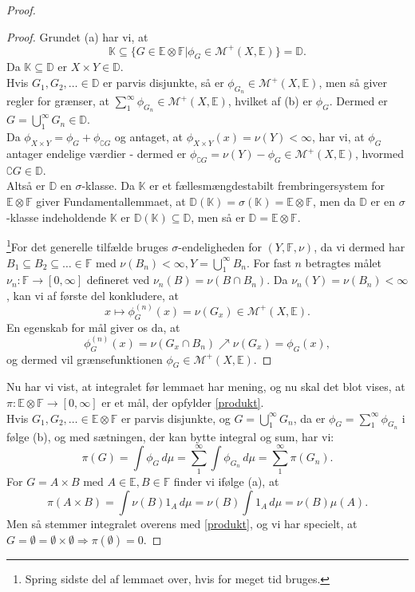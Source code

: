 \documentclass[12pt]{report}
\theoremstyle{break}
\newtheorem*{proof}{Bevis}
\theoremstyle{break}
\newcommand{\Int}[1]{\int#1\,d\mu}
\newcommand{\EE}{\mathbb{E}}
\newcommand{\FF}{\mathbb{F}}
\newcommand{\M}{\mathcal{M}^+}
\newcommand{\K}{\mathbb{K}}
\newcommand{\D}{\mathbb{D}}
\newcommand{\1}{\mathds{1}}
\begin{document}
\begin{proof}
\begin{proof}
\bigskip

Grundet (a) har vi, at 
\[\K\subseteq\{G\in\EE\otimes\FF\vert\phi_G\in\M(X,\EE)\}=\D.\]
Da $\K\subseteq\D$ er $X\times Y\in\D$.\\
Hvis $G_1,G_2,\ldots\in\D$ er parvis disjunkte, så er $\phi_{G_n}\in\M(X,\EE)$, men så giver regler for grænser, at $\sum_1^\infty\phi_{G_n}\in\M(X,\EE)$, hvilket af (b) er $\phi_G$. Dermed er $G=\bigcup_1^\infty G_n\in\D$.\\
Da $\phi_{X\times Y} = \phi_G + \phi_{\complement G}$ og antaget, at  $\phi_{X\times Y}(x)=\nu(Y)<\infty$, har vi, at $\phi_G$ antager endelige værdier - dermed er $\phi_{\complement G} = \nu(Y)-\phi_G\in\M(X,\EE)$, hvormed $\complement G\in\D$.\\
Altså er $\D$ en $\sigma$-klasse. Da $\K$ er et fællesmængdestabilt frembringersystem for $\EE\otimes\FF$ giver Fundamentallemmaet, at $\D(\K)=\sigma(\K)=\EE\otimes\FF$, men da $\D$ er en $\sigma$-klasse indeholdende $\K$ er $\D(\K)\subseteq\D$, men så er $\D=\EE\otimes\FF$.

\bigskip

\footnote{Spring sidste del af lemmaet over, hvis for meget tid bruges.}For det generelle tilfælde bruges $\sigma$-endeligheden for $(Y,\FF,\nu)$, da vi dermed har $B_1\subseteq B_2\subseteq\ldots\in\FF$ med $\nu(B_n)<\infty, Y=\bigcup_1^\infty B_n$. For fast $n$ betragtes målet $\nu_n\colon\FF\to[0,\infty]$ defineret ved $\nu_n(B)=\nu(B\cap B_n)$. Da $\nu_n(Y)=\nu(B_n)<\infty$, kan vi af første del konkludere, at
\[x\mapsto\phi^{(n)}_G(x)=\nu(G_x)\in\M(X,\EE).\]
En egenskab for mål giver os da, at 
\[\phi^{(n)}_G(x)=\nu(G_x\cap B_n)\nearrow\nu(G_x)=\phi_G(x),\]
og dermed vil grænsefunktionen $\phi_G\in\M(X,\EE).$
\end{proof}
Nu har vi vist, at integralet før lemmaet har mening, og nu skal det blot vises, at $\pi\colon\EE\otimes\FF\to[0,\infty]$ er et mål, der opfylder \eqref{produkt}.\\
Hvis $G_1,G_2,\ldots\in\EE\otimes\FF$ er parvis disjunkte, og $G=\bigcup_1^\infty G_n$, da er $\phi_G=\sum_1^\infty\phi_{G_n}$ i følge (b), og med sætningen, der kan bytte integral og sum, har vi:
\[\pi(G)=\Int{\phi_G}=\sum\limits^\infty_1\Int{\phi_{G_n}}=\sum\limits^\infty_1\pi(G_n).\]
For $G=A\times B$ med $A\in\EE, B\in\FF$ finder vi ifølge (a), at
\[\pi(A\times B)=\Int{\nu(B)1_A}=\nu(B)\Int{1_A}=\nu(B)\mu(A).\]
Men så stemmer integralet overens med \eqref{produkt}, og vi har specielt, at $G=\emptyset=\emptyset\times\emptyset\Rightarrow\pi(\emptyset)=0$.
\end{proof}
\end{document}
